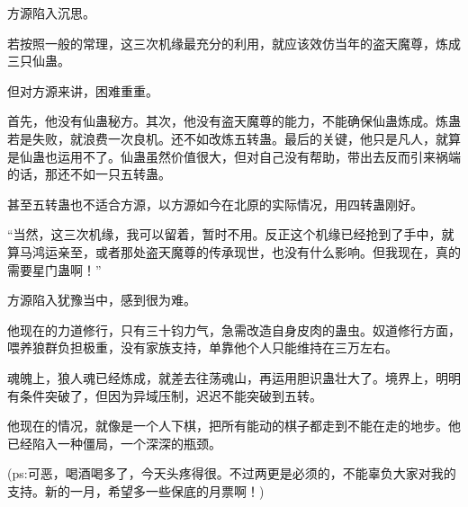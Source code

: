 \begin{this_body}
方源陷入沉思。

若按照一般的常理，这三次机缘最充分的利用，就应该效仿当年的盗天魔尊，炼成三只仙蛊。

但对方源来讲，困难重重。

首先，他没有仙蛊秘方。其次，他没有盗天魔尊的能力，不能确保仙蛊炼成。炼蛊若是失败，就浪费一次良机。还不如改炼五转蛊。最后的关键，他只是凡人，就算是仙蛊也运用不了。仙蛊虽然价值很大，但对自己没有帮助，带出去反而引来祸端的话，那还不如一只五转蛊。

甚至五转蛊也不适合方源，以方源如今在北原的实际情况，用四转蛊刚好。

“当然，这三次机缘，我可以留着，暂时不用。反正这个机缘已经抢到了手中，就算马鸿运亲至，或者那处盗天魔尊的传承现世，也没有什么影响。但我现在，真的需要星门蛊啊！”

方源陷入犹豫当中，感到很为难。

他现在的力道修行，只有三十钧力气，急需改造自身皮肉的蛊虫。奴道修行方面，喂养狼群负担极重，没有家族支持，单靠他个人只能维持在三万左右。

魂魄上，狼人魂已经炼成，就差去往荡魂山，再运用胆识蛊壮大了。境界上，明明有条件突破了，但因为异域压制，迟迟不能突破到五转。

他现在的情况，就像是一个人下棋，把所有能动的棋子都走到不能在走的地步。他已经陷入一种僵局，一个深深的瓶颈。

(ps:可恶，喝酒喝多了，今天头疼得很。不过两更是必须的，不能辜负大家对我的支持。新的一月，希望多一些保底的月票啊！)

\end{this_body}

